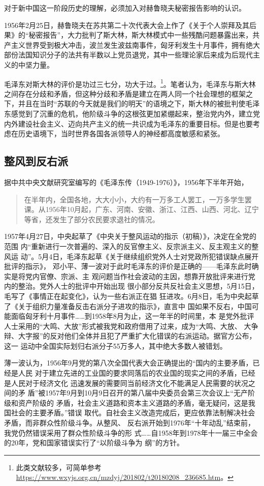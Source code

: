 对于新中国这一阶段历史的理解，必须加入对赫鲁晓夫秘密报告影响的认识。

1956年2月25日，赫鲁晓夫在苏共第二十次代表大会上作了《关于个人崇拜及其后果》的“秘密报告”，大力批判了斯大林，斯大林模式中一些残酷问题暴露出来，共产主义世界受到极大冲击，波兰发生波兹南事件，匈牙利发生十月事件，拥有绝大部份法国知识分子的法共有半数以上党员退党，其中一些理论家后来成为后现代主义的中坚力量。

毛泽东对斯大林的评价是功过三七分，功大于过。\footnote{此类文献较多，可简单参考\url{https://www.wxyjs.org.cn/mzdyj/201802/t20180208_236685.htm}。}。笔者认为，毛泽东与斯大林之间存在分歧和矛盾，但这种分歧和矛盾是建立在两人同一个社会理想的框架之下，并且在当时“苏联的今天就是我们的明天”的语境之下，斯大林的被批判使毛泽东感觉到了沉重的危机，他阶级斗争的这根弦更加紧绷起来，整治党内外，建立党内外建设社会主义、迈向共产主义的统一共识成为毛泽东的重要目标。但是也要考虑在历史语境下，当时世界各国各派领导人的神经都高度敏感和紧张。

\subsection{整风到反右派}

据中共中央文献研究室编写的《毛泽东传（1949-1976）》，1956年下半年开始，
\begin{quotation}在半年内，全国各地，大大小小，大约有一万多工人罢工，一万多学生罢课。从1956年10月起，广东、河南、安徽、浙江、江西、山西、河北、辽宁等省，还发生了部分农民要求退社的情况。
\end{quotation}

1957年4月27日，中央起草了《中央关于整风运动的指示（初稿）》，决定在全党的范围
内“重新进行一次普遍的、深入的反官僚主义、反宗派主义、反主观主义的整风运
动”。5月4日，毛泽东起草《关于继续组织党外人士对党政所犯错误缺点展开批评的指示》，
邓小平、薄一波对于此时毛泽东的评价是正确的——毛泽东此时确实是将党内官僚、宗派、主
观问题当作社会波动的主因，想靠开放批评来进行党内的整治。党外人士的批评中开始出现
很小部分反共反社会主义思想，5月15日，毛写了《事情正在起变化》，认为一些右派正在猖
狂进攻。6月8日，毛为中央起草了《关于组织力量准备反击右派分子进攻的指示》，直言中
国如果不反右，中国可能面临匈牙利十月事件……到1958年8月为止，这一年半的时间里，本
是党外批评人士采用的“大鸣、大放”形式被我党和政府借用了过来，成为“大鸣、大放、
大争辩、大字报”的反对他们全体并且犯了严重扩大化错误的右派运动。据官方公布，这一
运动中全国实际划归右派分子55万多人，其中绝大多数人被错划。

薄一波认为，1956年9月党的第八次全国代表大会正确提出的“国内的主要矛盾，已经是人民
对于建立先进的工业国的要求同落后的农业国的现实之间的矛盾，已经是人民对于经济文化
迅速发展的需要同当前经济文化不能满足人民需要的状况之间的矛
盾”被1957年9月到10月9日召开的第八届中央委员会第三次会议上“无产阶级和资产阶级的
矛盾，社会主义道路和资本主义道路的矛盾，毫无疑问，这是我国社会的主要矛盾。”错误
取代。自社会主义改造完成后，更应依靠法制解决社会矛盾，而非群众性阶级斗争。从整风、
反右派开始到1976年“十年动乱”结束前，我党仍然错误采用了群众性阶级斗争的形
式……自1958年到1978年十一届三中全会的20年，党和国家错误实行了“以阶级斗争为
纲”的方针。

